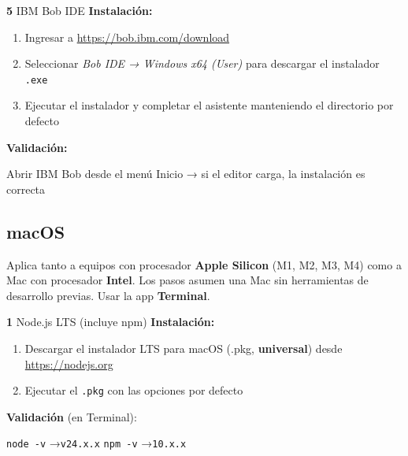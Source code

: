\documentclass[11pt, a4paper]{article}
\newcommand{\version}[1]{\texttt{\textcolor{ibmblue}{#1}}}
\newcommand{\cmd}[1]{\texttt{\textcolor{ibmdark}{\small #1}}}
\newcommand{\checkmark}{\textcolor{ibmgreen}{\faCheckCircle}}
\begin{document}
\vspace{6pt}
\begin{labbox}[ibmblue]{\textbf{5} \quad IBM Bob IDE}
\textbf{Instalación:}
\begin{enumerate}[leftmargin=*, nosep]
  \item Ingresar a \url{https://bob.ibm.com/download}
  \item Seleccionar \emph{Bob IDE → Windows x64 (User)} para descargar el instalador \texttt{.exe}
  \item Ejecutar el instalador y completar el asistente manteniendo el directorio por defecto
\end{enumerate}
\vspace{4pt}
\textbf{Validación:}
\begin{center}
  Abrir IBM Bob desde el menú Inicio → si el editor carga, la instalación es correcta \checkmark
\end{center}
\end{labbox}

\subsection{macOS}
\label{sec:macos}

Aplica tanto a equipos con procesador \textbf{Apple Silicon} (M1, M2, M3, M4) como a Mac con procesador \textbf{Intel}. Los pasos asumen una Mac sin herramientas de desarrollo previas. Usar la app \textbf{Terminal}.

\vspace{8pt}
\begin{labbox}[ibmdark]{\textbf{1} \quad Node.js LTS (incluye npm)}
\textbf{Instalación:}
\begin{enumerate}[leftmargin=*, nosep]
  \item Descargar el instalador LTS para macOS (.pkg, \textbf{universal}) desde \url{https://nodejs.org}
  \item Ejecutar el \texttt{.pkg} con las opciones por defecto
\end{enumerate}
\vspace{4pt}
\textbf{Validación} (en Terminal):
\begin{center}
  \cmd{node -v} \quad→\quad \version{v24.x.x} \checkmark \qquad
  \cmd{npm -v} \quad→\quad \version{10.x.x} \checkmark
\end{center}
\end{labbox}
\end{document}

